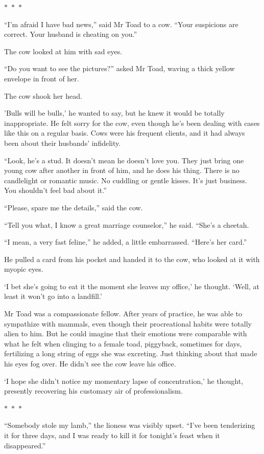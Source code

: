 \documentclass{memoir}
\newcommand{\starbreak}{%
\begin{center}
  $\ast$~$\ast$~$\ast$
\end{center}
}
\begin{document}
\starbreak

``I'm afraid I have bad news,'' said Mr Toad to a cow. ``Your suspicions are correct. Your husband is cheating on you.''

The cow looked at him with sad eyes.

``Do you want to see the pictures?'' asked Mr Toad, waving a thick yellow envelope in front of her. 

The cow shook her head. 

'Bulls will be bulls,' he wanted to say, but he knew it would be totally inappropriate. He felt sorry for the cow, even though he's been dealing with cases like this on a regular basis. Cows were his frequent clients, and it had always been about their husbands' infidelity. 

``Look, he's a stud. It doesn't mean he doesn't love you. They just bring one young cow after another in front of him, and he does his thing. There is no candlelight or romantic music. No cuddling or gentle kisses. It's just business. You shouldn't feel bad about it.''

``Please, spare me the details,'' said the cow.

``Tell you what, I know a great marriage counselor,'' he said. ``She's a cheetah.

``I mean, a very fast feline,'' he added, a little embarrassed. ``Here's her card.''

He pulled a card from his pocket and handed it to the cow, who looked at it with myopic eyes.

`I bet she's going to eat it the moment she leaves my office,' he thought. `Well, at least it won't go into a landfill.'

Mr Toad was a compassionate fellow. After years of practice, he was able to sympathize with mammals, even though their procreational habits were totally alien to him. But he could imagine that their emotions were comparable with what he felt when clinging to a female toad, piggyback, sometimes for days, fertilizing a long string of eggs she was excreting. Just thinking about that made his eyes fog over. He didn't see the cow leave his office. 

`I hope she didn't notice my momentary lapse of concentration,' he thought, presently recovering his customary air of professionalism. 

\starbreak


``Somebody stole my lamb,'' the lioness was visibly upset. ``I've been tenderizing it for three days, and I was ready to kill it for tonight's feast when it disappeared.''
\end{document}
